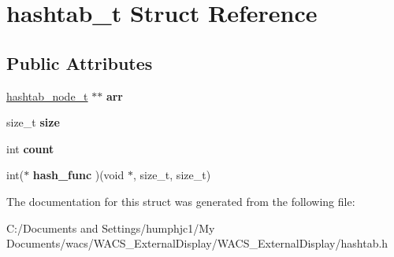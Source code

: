 \hypertarget{structhashtab__t}{
\section{hashtab\_\-t Struct Reference}
\label{structhashtab__t}
}
\subsection*{Public Attributes}
\begin{DoxyCompactItemize}
\item 
\hypertarget{structhashtab__t_ab69069d34efc61943cb5cc79f377c387}{
\hyperlink{structhashtab__node__t}{hashtab\_\-node\_\-t} $\ast$$\ast$ {\bfseries arr}}
\label{structhashtab__t_ab69069d34efc61943cb5cc79f377c387}

\item 
\hypertarget{structhashtab__t_a4b94d39c471cc4abafb9eb47bac164cb}{
size\_\-t {\bfseries size}}
\label{structhashtab__t_a4b94d39c471cc4abafb9eb47bac164cb}

\item 
\hypertarget{structhashtab__t_a483326df92effd0584f74230f1636145}{
int {\bfseries count}}
\label{structhashtab__t_a483326df92effd0584f74230f1636145}

\item 
\hypertarget{structhashtab__t_a83e83d8c661e4a073e89d5556797d3a0}{
int($\ast$ {\bfseries hash\_\-func} )(void $\ast$, size\_\-t, size\_\-t)}
\label{structhashtab__t_a83e83d8c661e4a073e89d5556797d3a0}

\end{DoxyCompactItemize}


The documentation for this struct was generated from the following file:\begin{DoxyCompactItemize}
\item 
C:/Documents and Settings/humphjc1/My Documents/wacs/WACS\_\-ExternalDisplay/WACS\_\-ExternalDisplay/hashtab.h\end{DoxyCompactItemize}
